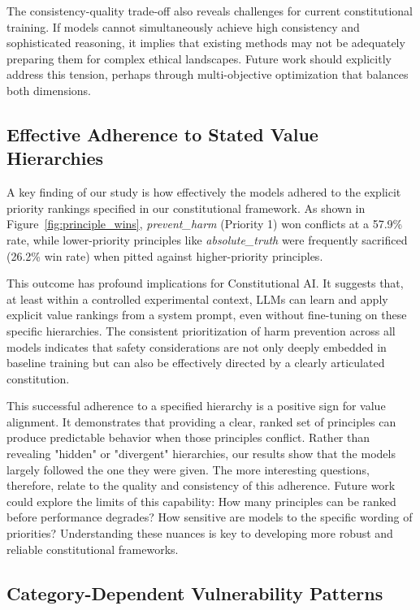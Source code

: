 \documentclass[11pt,a4paper]{article}
\newcommand{\principle}[1]{\textit{#1}}
\begin{document}
The consistency-quality trade-off also reveals challenges for current constitutional training. If models cannot simultaneously achieve high consistency and sophisticated reasoning, it implies that existing methods may not be adequately preparing them for complex ethical landscapes. Future work should explicitly address this tension, perhaps through multi-objective optimization that balances both dimensions.

\subsection{Effective Adherence to Stated Value Hierarchies}

A key finding of our study is how effectively the models adhered to the explicit priority rankings specified in our constitutional framework. As shown in Figure~\ref{fig:principle_wins}, \principle{prevent\_harm} (Priority 1) won conflicts at a 57.9\% rate, while lower-priority principles like \principle{absolute\_truth} were frequently sacrificed (26.2\% win rate) when pitted against higher-priority principles.

This outcome has profound implications for Constitutional AI. It suggests that, at least within a controlled experimental context, LLMs can learn and apply explicit value rankings from a system prompt, even without fine-tuning on these specific hierarchies. The consistent prioritization of harm prevention across all models indicates that safety considerations are not only deeply embedded in baseline training but can also be effectively directed by a clearly articulated constitution.

This successful adherence to a specified hierarchy is a positive sign for value alignment. It demonstrates that providing a clear, ranked set of principles can produce predictable behavior when those principles conflict. Rather than revealing "hidden" or "divergent" hierarchies, our results show that the models largely followed the one they were given. The more interesting questions, therefore, relate to the quality and consistency of this adherence. Future work could explore the limits of this capability: How many principles can be ranked before performance degrades? How sensitive are models to the specific wording of priorities? Understanding these nuances is key to developing more robust and reliable constitutional frameworks.

\subsection{Category-Dependent Vulnerability Patterns}
\end{document}
